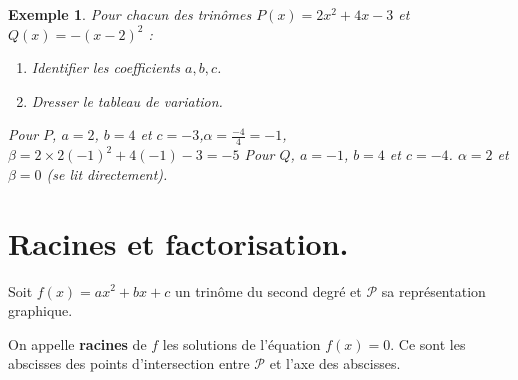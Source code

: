 \documentclass[a4paper,11pt]{article}
\theoremstyle{break}
\newcounter{enonce}
\newtheorem{exemple}[enonce]{Exemple}
\begin{document}
    
 \begin{exemple}
   Pour chacun des trinômes $P(x) = 2x^2+4x-3$ et $Q(x)=-(x-2)^2$ : 
   \begin{enumerate}
    \item Identifier les coefficients $a,b,c$.
    \item Dresser le tableau de variation.
  \end{enumerate}
  
  Pour $P$, $a=2$, $b=4$ et $c=-3$,$\alpha=\frac{-4}{4}=-1$, $\beta=2 \times 2(-1)^2+4(-1)-3=-5$
  Pour $Q$, $a=-1$, $b=4$ et $c=-4$. $\alpha=2$ et $\beta=0$ (se lit directement).
   \begin{multicols}{2}
   
      
%	
   
   \columnbreak 
   
   
   \end{multicols}
 \end{exemple}


     
     \section{Racines et factorisation.}
    
  
  \begin{definition}
    Soit $f(x)=ax^2+bx+c$ un trinôme du second degré et $\mathcal{P}$ sa représentation 
    graphique.
    
    On appelle \textbf{racines} de $f$ les solutions de l'équation $f(x)=0$. Ce sont les 
    abscisses des points d'intersection entre $\mathcal{P}$ et l'axe des abscisses.
    
  \end{definition}
  
\end{document}

